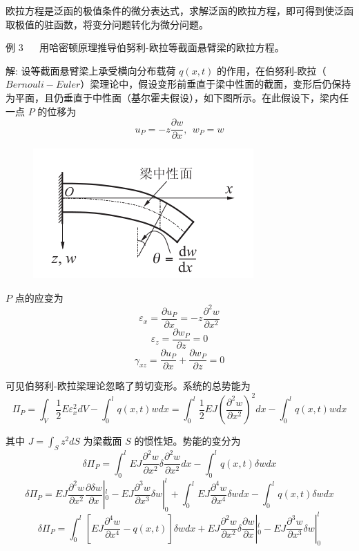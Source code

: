 \documentclass[12pt,a4paper]{article}
\begin{document}
欧拉方程是泛函的极值条件的微分表达式，求解泛函的欧拉方程，即可得到使泛函取极值的驻函数，将变分问题转化为微分问题。

例 $3$ ~~ 用哈密顿原理推导伯努利-欧拉等截面悬臂梁的欧拉方程。

解: 设等截面悬臂梁上承受横向分布载荷 $q(x,t)$ 的作用，在伯努利-欧拉（$Bernouli-Euler$）梁理论中，假设变形前垂直于梁中性面的截面，变形后仍保持为平面，且仍垂直于中性面（基尔霍夫假设），如下图所示。在此假设下，梁内任一点 $P$ 的位移为
$$
u_P=-z\frac{\partial w}{\partial x}, ~~ w_P=w
$$

\begin{figure}[H]
\centering
\includegraphics[scale=0.6]{./figures/7.png}
\caption{}
\end{figure}

$P$ 点的应变为
$$
\varepsilon_x=\frac{\partial u_P}{\partial x}=-z\frac{\partial^2 w}{\partial x^2}
$$
$$
\varepsilon_z=\frac{\partial w_P}{\partial z}=0
$$
$$
\gamma_{xz}=\frac{\partial u_P}{\partial x}+\frac{\partial w_P}{\partial z}=0
$$

可见伯努利-欧拉梁理论忽略了剪切变形。系统的总势能为
\begin{equation}
\Pi _P=\int_{V}\frac{1}{2}E\varepsilon^2_xdV-\int_{0}^{l}q(x,t)wdx=\int_{0}^{l}\frac{1}{2}EJ\left(\frac{\partial^2 w}{\partial x^2}\right)^2dx-\int_{0}^{l}q(x,t)wdx
\end{equation}

其中 $J=\int_{S}z^2dS$ 为梁截面 $S$ 的惯性矩。势能的变分为
$$
\delta\Pi _P=\int_{0}^{l}EJ\frac{\partial^2 w}{\partial x^2}\delta\frac{\partial^2 w}{\partial x^2}dx-\int_{0}^{l}q(x,t)\delta wdx
$$
$$
\delta\Pi _P=EJ\frac{\partial^2 w}{\partial x^2}\frac{\partial\delta w}{\partial x}|^l_0-EJ\frac{\partial^3 w}{\partial x^3}\delta w|^l_0+\int_{0}^{l}EJ\frac{\partial^4 w}{\partial x^4}\delta wdx-\int_{0}^{l}q(x,t)\delta wdx
$$
$$
\delta\Pi _P=\int_{0}^{l}\left[EJ\frac{\partial^4 w}{\partial x^4}-q(x,t)\right]\delta wdx+EJ\frac{\partial^2 w}{\partial x^2}\delta\frac{\partial w}{\partial x}|^l_0-EJ\frac{\partial^3 w}{\partial x^3}\delta w|^l_0
$$
\end{document}

